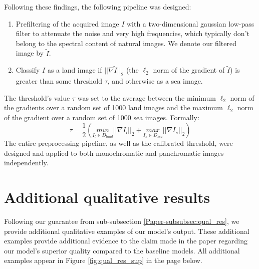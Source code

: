 \documentclass[10pt,twocolumn,letterpaper]{article}
\begin{document}
Following these findings, the following pipeline was designed:
\begin{enumerate}
    \item Prefiltering of the acquired image $I$ with a two-dimensional gaussian low-pass filter to attenuate the noise and very high frequencies, which typically don't belong to the spectral content of natural images. 
    We denote our filtered image by $\tilde{I}$.
    \item Classify $I$ as a land image if $||\nabla \tilde{I}||_2$ (the $\ell_2$ norm of the gradient of $\tilde{I}$) is greater than some threshold $\tau$, and otherwise as a sea image. 
\end{enumerate}
The threshold's value $\tau$ was set to the average between the minimum $\ell_2$ norm of the gradients over a random set of 1000 land images and the maximum $\ell_2$ norm of the gradient over a random set of 1000 sea images.
Formally:
\begin{equation}
    \tau = \frac{1}{2} \left( \underset{I_\mathit{l} \in D_\mathit{land}}{min} ||\nabla I_\mathit{l}||_2 
    + \underset{I_\mathit{s} \in D_\mathit{sea}}{max} ||\nabla I_\mathit{s}||_2 \right)
\end{equation}
The entire preprocessing pipeline, as well as the calibrated threshold, were designed and applied to both monochromatic and panchromatic images independently.

\section{Additional qualitative results} \label{sec:additional_res}
Following our guarantee from sub-subsection \ref{Paper-subsubsec:qual_res}, we provide additional qualitative examples of our model's output. 
These additional examples provide additional evidence to the claim made in the paper regarding our model's superior quality compared to the baseline models.
All additional examples appear in Figure \ref{fig:qual_res_sup} in the page below.
\cleardoublepage
\end{document}
